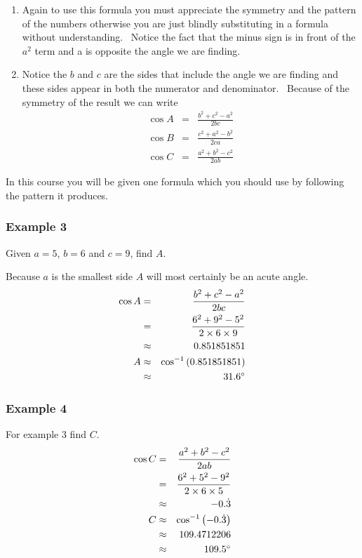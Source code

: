 \begin{enumerate}
\item Again to use this formula you must appreciate the symmetry and the pattern of the numbers otherwise you are
just blindly substituting in a formula without understanding. \ Notice the fact that the minus sign is in front
of the $a^{2}$ term and a is opposite the angle we are finding. 

\item Notice the $b$ and $c$ are the sides that include the angle we are finding and these sides appear in both the numerator and denominator. \ Because
of the symmetry of the result we can write
\begin{align*}\cos  A &  = & \frac{b^{2} +c^{2} -a^{2}}{2 b c} \\
\cos  B &  = & \frac{c^{2} +a^{2} -b^{2}}{2 c a} \\
\cos  C &  = & \frac{a^{2} +b^{2} -c^{2}}{2 a b}\end{align*}\end{enumerate}


In this course you will be given one formula which
you should use by following the pattern it produces. 

\subsubsection{Example 3}
Given $a =5$, $b =6$ and $c =9$, find $A$. 

Because $a$ is the smallest side $A$ will most certainly be an acute angle.
\begin{align*}\cos  A &  = & \frac{b^{2} +c^{2} -a^{2}}{2 b c} \\
 &  = & \frac{6^{2} +9^{2} -5^{2}}{2 \times 6 \times 9} \\
 &  \approx  & 0.851851851 \\
A &  \approx  & \cos ^{ -1} \left (0.851851851\right ) \\
 &  \approx  & 31.6 \mbox{{\ensuremath{{}^\circ}}}\end{align*}

\subsubsection{Example 4}
For example 3 find $C$.
\begin{align*}\cos  C &  = & \frac{a^{2} +b^{2} -c^{2}}{2 a b} \\
 &  = & \frac{6^{2} +5^{2} -9^{2}}{2 \times 6 \times 5} \\
 &  \approx  &  -0. \dot{3} \\
C &  \approx  & \cos ^{ -1} \left ( -0. \dot{3}\right ) \\
 &  \approx  & 109.4712206 \\
 &  \approx  & 109.5 \mbox{{\ensuremath{{}^\circ}}}\end{align*}


